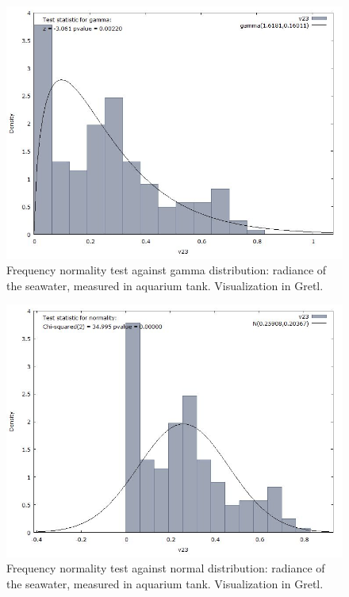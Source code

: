 \documentclass[10pt, a4paper]{article}
\begin{document}
\begin{appendices}
\begin{figure}[h]
\begin{center}
\includegraphics[scale=0.4]{G-gamma-rad.jpg}
\caption{Frequency normality test against gamma distribution: radiance of the seawater, measured in aquarium tank. Visualization in Gretl.­}
\label{fig:48}
\end{center}
\end{figure}
\begin{figure}[H]
\centering
\includegraphics[scale=0.4]{G-normal-dist.jpg}
\caption{Frequency normality test against normal distribution: radiance of the seawater, measured in aquarium tank. Visualization in Gretl.­}
\label{fig:49}
\end{figure}


\end{appendices}
\end{document}
